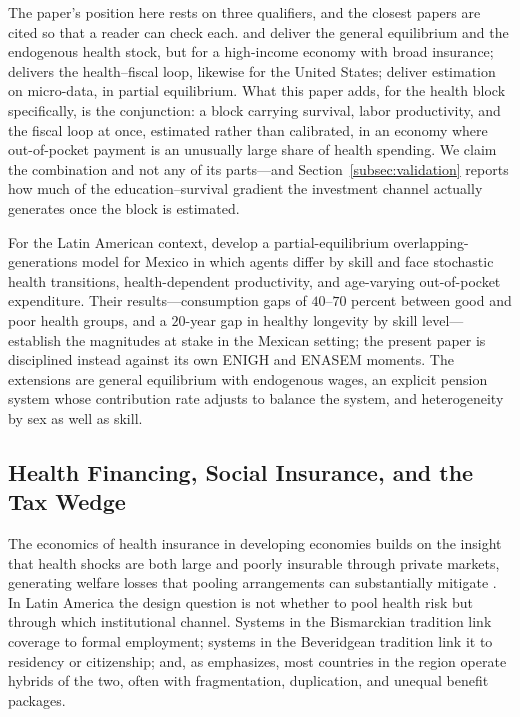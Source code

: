 \documentclass[12pt,a4paper]{article}
\begin{document}
The paper's position here rests on three qualifiers, and the
closest papers are cited so that a reader can check each. \citet{JungTran2016} and
\citet{JungTranChambers2017} deliver the general equilibrium and the endogenous
health stock, but for a high-income economy with broad insurance;
\citet{Zhao2014} delivers the health--fiscal loop, likewise for the United
States; \citet{HosseiniKopeckyZhao} deliver estimation on micro-data, in partial
equilibrium. What this paper adds, for the health block specifically, is the conjunction: a block carrying survival, labor productivity, and the fiscal loop at once, estimated rather than calibrated, in an economy where out-of-pocket payment is an unusually large share of health spending. We claim the combination and not any of its parts---and Section~\ref{subsec:validation} reports how much of the education--survival gradient the investment channel actually generates once the block is estimated.

For the Latin American context, \citet{CortesEtAl2024} develop a
partial-equilibrium overlapping-generations model for Mexico in which agents
differ by skill and face stochastic health transitions, health-dependent
productivity, and age-varying out-of-pocket expenditure. Their
results---consumption gaps of $40$--$70$ percent between good and poor health
groups, and a $20$-year gap in healthy longevity by skill level---establish the
magnitudes at stake in the Mexican setting; the present paper is disciplined
instead against its own ENIGH and ENASEM moments. The extensions are general
equilibrium with endogenous wages, an explicit pension system whose contribution
rate adjusts to balance the system, and heterogeneity by sex as well as skill.

\subsection{Health Financing, Social Insurance, and the Tax Wedge}
\label{subsec:lit_health}

The economics of health insurance in developing economies builds on the insight
that health shocks are both large and poorly insurable through private markets,
generating welfare losses that pooling arrangements can substantially mitigate
\citep{Arrow1963}. In Latin America the design question is not whether to pool
health risk but through which institutional channel. Systems in the Bismarckian
tradition link coverage to formal employment; systems in the Beveridgean
tradition link it to residency or citizenship; and, as \citet{Levy2008}
emphasizes, most countries in the region operate hybrids of the two, often with
fragmentation, duplication, and unequal benefit packages.
\end{document}
